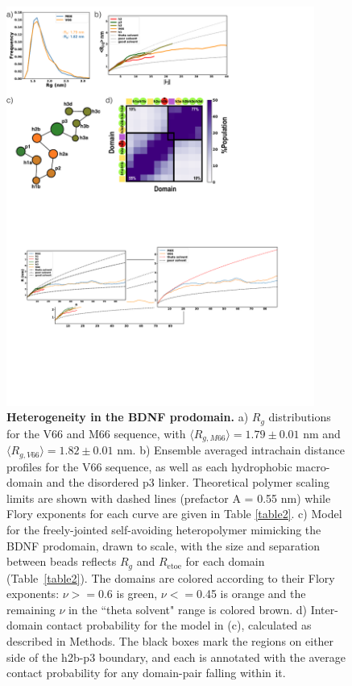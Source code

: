 \documentclass[10pt,letterpaper]{article}
\begin{document}
\begin{figure}[!ht]
\includegraphics[scale=0.5,width=0.9\textwidth,trim={0 0cm 0 0cm},clip]{../figures/fig3.pdf}
\caption{{\bf Heterogeneity in the BDNF prodomain.} a) $R_g$ distributions for the V66 and M66 sequence, with $\langle R_{g,M66}\rangle= 1.79 \pm {0.01}$ nm and $\langle R_{g,V66}\rangle = 1.82 \pm {0.01}$ nm. b) Ensemble averaged intrachain distance profiles for the V66 sequence, as well as each hydrophobic macro-domain and the disordered p3 linker. Theoretical polymer scaling limits are shown with dashed lines (prefactor A = 0.55 nm) while Flory exponents for each curve are given in Table \ref{table2}. c) Model for the freely-jointed self-avoiding heteropolymer mimicking the BDNF prodomain, drawn to scale, with the size and separation between beads reflects $R_g$ and $R_{\mathrm{etoe}}$ for each domain (Table~\ref{table2}). The domains are colored according to their Flory exponents: $\nu$$>=$0.6 is green, $\nu$$<=$0.45 is orange and the remaining $\nu$ in the ``theta solvent" range is colored brown. d) Inter-domain contact probability for the model in (c), calculated as described in Methods. The black boxes mark the regions on either side of the h2b-p3 boundary, and each is annotated with the average contact probability for any domain-pair falling within it.} 
\label{fig3}
\end{figure}
\end{document}
